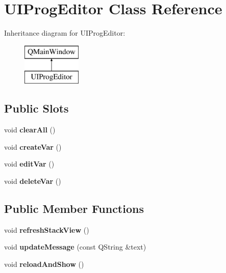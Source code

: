 \hypertarget{class_u_i_prog_editor}{}\section{U\+I\+Prog\+Editor Class Reference}
\label{class_u_i_prog_editor}
Inheritance diagram for U\+I\+Prog\+Editor\+:\begin{figure}[H]
\begin{center}
\leavevmode
\includegraphics[height=2.000000cm]{class_u_i_prog_editor}
\end{center}
\end{figure}
\subsection*{Public Slots}
\begin{DoxyCompactItemize}
\item 
void {\bfseries clear\+All} ()\hypertarget{class_u_i_prog_editor_ad8b479245de86dfa9fe856416bc0bbe0}{}\label{class_u_i_prog_editor_ad8b479245de86dfa9fe856416bc0bbe0}

\item 
void {\bfseries create\+Var} ()\hypertarget{class_u_i_prog_editor_a1e205450107a5837c3bb72135d2db040}{}\label{class_u_i_prog_editor_a1e205450107a5837c3bb72135d2db040}

\item 
void {\bfseries edit\+Var} ()\hypertarget{class_u_i_prog_editor_a812258142464a5c92ac1f51a2cc2592d}{}\label{class_u_i_prog_editor_a812258142464a5c92ac1f51a2cc2592d}

\item 
void {\bfseries delete\+Var} ()\hypertarget{class_u_i_prog_editor_a037a91e38054bc88cbd930f88767743d}{}\label{class_u_i_prog_editor_a037a91e38054bc88cbd930f88767743d}

\end{DoxyCompactItemize}
\subsection*{Public Member Functions}
\begin{DoxyCompactItemize}
\item 
void {\bfseries refresh\+Stack\+View} ()\hypertarget{class_u_i_prog_editor_abf170f60154887d115b9696933d3d8c0}{}\label{class_u_i_prog_editor_abf170f60154887d115b9696933d3d8c0}

\item 
void {\bfseries update\+Message} (const Q\+String \&text)\hypertarget{class_u_i_prog_editor_a0784a1a58284db71001e6e3cef053d3a}{}\label{class_u_i_prog_editor_a0784a1a58284db71001e6e3cef053d3a}

\item 
void {\bfseries reload\+And\+Show} ()\hypertarget{class_u_i_prog_editor_ab848ac47cf654f0aa2997327c8bc4ea5}{}\label{class_u_i_prog_editor_ab848ac47cf654f0aa2997327c8bc4ea5}

\end{DoxyCompactItemize}
